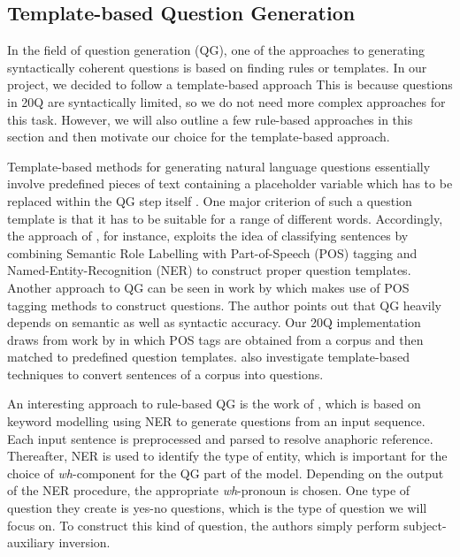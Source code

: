 \documentclass[11pt,a4paper]{article}
\begin{document}
\subsection{Template-based Question Generation}
\label{subsec:qglit}


In the field of question generation (QG), one of the approaches to generating syntactically coherent questions is based on finding rules or templates. 
In our project, we decided to follow a template-based approach
This is because questions in 20Q are syntactically limited, so we do not need more complex approaches for this task.
However, we will also outline a few rule-based approaches in this section and then motivate our choice for the template-based approach.

Template-based methods for generating natural language questions essentially involve predefined pieces of text containing a placeholder variable which has to be replaced within the QG step itself \citep{Mandasari2019}. 
One major criterion of such a question template is that it has to be suitable for a range of different words. 
Accordingly, the approach of \citet{Mandasari2019}, for instance, exploits the idea of classifying sentences by combining Semantic Role Labelling with Part-of-Speech (POS) tagging and Named-Entity-Recognition (NER) to construct proper question templates. 
Another approach to QG can be seen in work by \citet{Zerr2014} which makes use of POS tagging methods to construct questions. The author points out that QG heavily depends on semantic as well as syntactic accuracy. 
Our 20Q implementation draws from work by \citet{Zerr2014} in which POS tags are obtained from a corpus and then matched to predefined question templates. \citet{FabbriEa2020} also investigate template-based techniques to convert sentences of a corpus into questions. 

An interesting approach to rule-based QG is the work of \citet{MhatreEa2019}, which is based on keyword modelling using NER to generate questions from an input sequence. 
Each input sentence is preprocessed and parsed to resolve anaphoric reference. 
Thereafter, NER is used to identify the type of entity, which is important for the choice of \textit{wh}-component for the QG part of the model. 
Depending on the output of the NER procedure, the appropriate \textit{wh}-pronoun is chosen. 
One type of question they create is yes-no questions, which is the type of question we will focus on.
To construct this kind of question, the authors simply perform subject-auxiliary inversion. 
\end{document}
